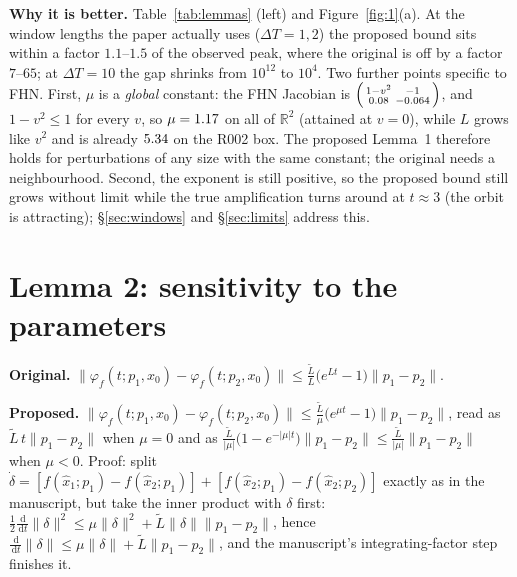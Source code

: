 \documentclass[10pt]{article}
\newcommand{\orig}[1]{\textcolor{black!60}{\textbf{Original.}} #1}
\newcommand{\prop}[1]{\textcolor{blue!60!black}{\textbf{Proposed.}} #1}
\newcommand{\gain}[1]{\textcolor{green!45!black}{\textbf{Why it is better.}} #1}
\newcommand{\norm}[1]{\lVert #1\rVert}
\newcommand{\dd}{\,\mathrm{d}}
\begin{document}
\gain{} Table~\ref{tab:lemmas} (left) and Figure~\ref{fig:1}(a). At the window lengths the paper actually uses ($\Delta T=1,2$) the proposed bound sits within a factor $1.1$--$1.5$ of the observed peak, where the original is off by a factor $7$--$65$; at $\Delta T=10$ the gap shrinks from $10^{12}$ to $10^{4}$. Two further points specific to FHN. First, $\mu$ is a \emph{global} constant: the FHN Jacobian is $\begin{psmallmatrix}1-v^2&-1\\0.08&-0.064\end{psmallmatrix}$, and $1-v^2\le1$ for every $v$, so $\mu=1.17$ on all of $\mathbb R^2$ (attained at $v=0$), while $L$ grows like $v^2$ and is already $5.34$ on the R002 box. The proposed Lemma~1 therefore holds for perturbations of any size with the same constant; the original needs a neighbourhood. Second, the exponent is still positive, so the proposed bound still grows without limit while the true amplification turns around at $t\approx3$ (the orbit is attracting); \S\ref{sec:windows} and \S\ref{sec:limits} address this.

\begin{table}[t]\centering\small
\caption{Original versus proposed bounds on FHN, evaluated at $t=\Delta T$, against the largest value observed over the 24 R002 probes for $t\le\Delta T$ (Lemma~1: $x_2=x_1+10^{-3}u$, $u$ a random unit vector, at four orbit phases; Lemma~2: $p_2=p^\star+10^{-3}u$, $u\in\mathbb R^{20}$). All bounds hold on every probe (gates G4--G7). Source: \texttt{analysis/results/lemma1\_table.csv}, \texttt{lemma2\_table.csv}.}\label{tab:lemmas}

\end{table}

\section{Lemma 2: sensitivity to the parameters}
\orig{} $\norm{\varphi_f(t;p_1,x_0)-\varphi_f(t;p_2,x_0)}\le\frac{\tilde L}{L}\big(e^{Lt}-1\big)\norm{p_1-p_2}$.

\prop{} $\norm{\varphi_f(t;p_1,x_0)-\varphi_f(t;p_2,x_0)}\le\frac{\tilde L}{\mu}\big(e^{\mu t}-1\big)\norm{p_1-p_2}$, read as $\tilde L\,t\norm{p_1-p_2}$ when $\mu=0$ and as $\frac{\tilde L}{|\mu|}\big(1-e^{-|\mu|t}\big)\norm{p_1-p_2}\le\frac{\tilde L}{|\mu|}\norm{p_1-p_2}$ when $\mu<0$. Proof: split $\dot\delta=[f(\hat x_1;p_1)-f(\hat x_2;p_1)]+[f(\hat x_2;p_1)-f(\hat x_2;p_2)]$ exactly as in the manuscript, but take the inner product with $\delta$ first:
$\tfrac12\tfrac{\dd}{\dd t}\norm\delta^2\le\mu\norm\delta^2+\tilde L\norm\delta\norm{p_1-p_2}$, hence $\tfrac{\dd}{\dd t}\norm\delta\le\mu\norm\delta+\tilde L\norm{p_1-p_2}$, and the manuscript's integrating-factor step finishes it.
\end{document}

